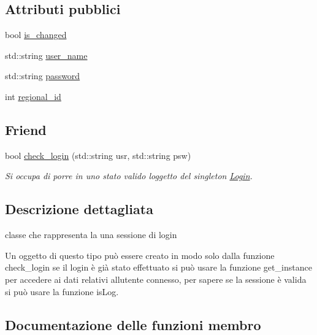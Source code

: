 \subsection*{Attributi pubblici}
\begin{DoxyCompactItemize}
\item 
bool \mbox{\hyperlink{structmm_1_1model_1_1authentication_1_1_login_aa74e292b2be0f1e2146576108e74db97}{is\+\_\+changed}}
\item 
std\+::string \mbox{\hyperlink{structmm_1_1model_1_1authentication_1_1_login_aeb7a295a6770bf778d747903045fe288}{user\+\_\+name}}
\item 
std\+::string \mbox{\hyperlink{structmm_1_1model_1_1authentication_1_1_login_adc6b1c53cf3e012f10c8b315a1df364f}{password}}
\item 
int \mbox{\hyperlink{structmm_1_1model_1_1authentication_1_1_login_a3b3c96185f5ad0c1e9ea15cd401ce064}{regional\+\_\+id}}
\end{DoxyCompactItemize}
\subsection*{Friend}
\begin{DoxyCompactItemize}
\item 
bool \mbox{\hyperlink{structmm_1_1model_1_1authentication_1_1_login_a5023cb987e79151f2a1ed18b9a86a3e8}{check\+\_\+login}} (std\+::string usr, std\+::string psw)
\begin{DoxyCompactList}\small\item\em Si occupa di porre in uno stato valido l\textquotesingle{}oggetto del singleton \mbox{\hyperlink{structmm_1_1model_1_1authentication_1_1_login}{Login}}. \end{DoxyCompactList}\end{DoxyCompactItemize}


\subsection{Descrizione dettagliata}
classe che rappresenta la una sessione di login 

Un oggetto di questo tipo può essere creato in modo solo dalla funzione check\+\_\+login se il login è già stato effettuato si può usare la funzione get\+\_\+instance per accedere ai dati relativi all\textquotesingle{}utente connesso, per sapere se la sessione è valida si può usare la funzione is\+Log. 

\subsection{Documentazione delle funzioni membro}
\mbox{\label{structmm_1_1model_1_1authentication_1_1_login_a37112a637ed012c96a96c5a2366f4220}} 
